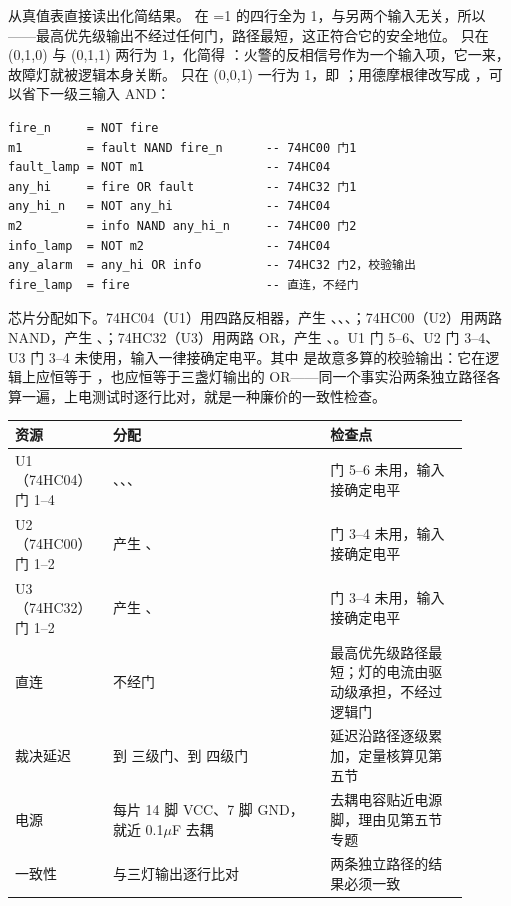 从真值表直接读出化简结果。 在 =1 的四行全为 1，与另两个输入无关，所以 ——最高优先级输出不经过任何门，路径最短，这正符合它的安全地位。 只在 (0,1,0) 与 (0,1,1) 两行为 1，化简得 ：火警的反相信号作为一个输入项，它一来，故障灯就被逻辑本身关断。 只在 (0,0,1) 一行为 1，即 ；用德摩根律改写成 ，可以省下一级三输入 AND：

\begin{lstlisting}
fire_n     = NOT fire
m1         = fault NAND fire_n      -- 74HC00 门1
fault_lamp = NOT m1                 -- 74HC04
any_hi     = fire OR fault          -- 74HC32 门1
any_hi_n   = NOT any_hi             -- 74HC04
m2         = info NAND any_hi_n     -- 74HC00 门2
info_lamp  = NOT m2                 -- 74HC04
any_alarm  = any_hi OR info         -- 74HC32 门2，校验输出
fire_lamp  = fire                   -- 直连，不经门
\end{lstlisting}

芯片分配如下。74HC04（U1）用四路反相器，产生 、、、；74HC00（U2）用两路 NAND，产生 、；74HC32（U3）用两路 OR，产生 、。U1 门 5–6、U2 门 3–4、U3 门 3–4 未使用，输入一律接确定电平。其中  是故意多算的校验输出：它在逻辑上应恒等于 ，也应恒等于三盏灯输出的 OR——同一个事实沿两条独立路径各算一遍，上电测试时逐行比对，就是一种廉价的一致性检查。

\begin{longtable}{L{0.18\linewidth}L{0.44\linewidth}L{0.28\linewidth}}
\toprule
资源 & 分配 & 检查点 \\
\midrule
U1（74HC04）门 1–4 & 、、、 & 门 5–6 未用，输入接确定电平 \\\tablerowrule
U2（74HC00）门 1–2 & 产生 、 & 门 3–4 未用，输入接确定电平 \\\tablerowrule
U3（74HC32）门 1–2 & 产生 、 & 门 3–4 未用，输入接确定电平 \\\tablerowrule
{} 直连 &  不经门 & 最高优先级路径最短；灯的电流由驱动级承担，不经过逻辑门 \\\tablerowrule
裁决延迟 &  到  三级门、到  四级门 & 延迟沿路径逐级累加，定量核算见第五节 \\\tablerowrule
电源 & 每片 14 脚 VCC、7 脚 GND，就近 0.1$\mu$F 去耦 & 去耦电容贴近电源脚，理由见第五节专题 \\\tablerowrule
一致性 &  与三灯输出逐行比对 & 两条独立路径的结果必须一致 \\
\bottomrule
\end{longtable}

